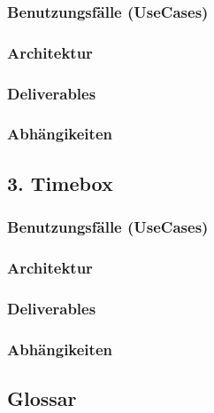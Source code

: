 \documentclass{article}
\begin{document}
\subsubsection{Benutzungsfälle (UseCases)}
\subsubsection{Architektur}
\subsubsection{Deliverables}
\subsubsection{Abhängikeiten}

\subsection{3. Timebox}
\subsubsection{Benutzungsfälle (UseCases)}
\subsubsection{Architektur}
\subsubsection{Deliverables}
\subsubsection{Abhängikeiten}

\subsection{Glossar}
\end{document}
